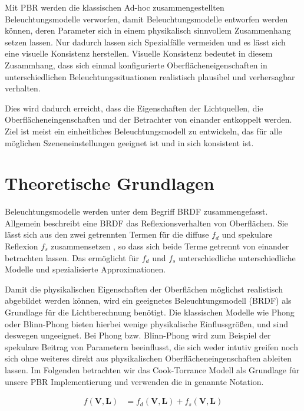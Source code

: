 Mit \ac{PBR} werden die klassischen Ad-hoc zusammengestellten Beleuchtungsmodelle verworfen, damit Beleuchtungsmodelle entworfen werden können, deren Parameter sich in einem physikalisch sinnvollem Zusammenhang setzen lassen. Nur dadurch lassen sich Spezialfälle vermeiden und es lässt sich eine visuelle Konsistenz herstellen. Visuelle Konsistenz bedeutet in diesem Zusammhang, dass sich einmal konfigurierte Oberflächeneigenschaften in unterschiedlichen Beleuchtungssituationen realistisch plausibel und verhersagbar verhalten. 

Dies wird dadurch erreicht, dass die Eigenschaften der Lichtquellen, die Oberflächeneingenschaften und der Betrachter von einander entkoppelt werden. Ziel ist meist ein einheitliches Beleuchtungsmodell zu entwickeln, das für alle möglichen Szeneneinstellungen geeignet ist und in sich konsistent ist.

\section{Theoretische Grundlagen}
\label{sec:pbr-grundlagen}

Beleuchtungsmodelle werden unter dem Begriff \acf{BRDF} zusammengefasst. Allgemein beschreibt eine \ac{BRDF} das Reflexionsverhalten von Oberflächen. Sie lässt sich aus den zwei getrennten Termen für die diffuse $f_d$ und spekulare Reflexion $f_s$ zusammensetzen \parencite[Kapitel 3.1.2, Seite 7]{Rousiers2014}, so dass sich beide Terme getrennt von einander betrachten lassen. Das ermöglicht für $f_d$ und $f_s$ unterschiedliche unterschiedliche Modelle und spezialisierte Approximationen.

Damit die physikalischen Eigenschaften der Oberflächen möglichst realistisch abgebildet werden können, wird ein geeignetes Beleuchtungsmodell (\acf{BRDF}) als Grundlage für die Lichtberechnung benötigt. Die klassischen Modelle wie Phong oder Blinn-Phong bieten hierbei wenige physikalische Einflussgrößen, und sind deswegen ungeeignet. Bei Phong bzw. Blinn-Phong wird zum Beispiel der spekulare Beitrag von Parametern beeinflusst, die sich weder intutiv greifen noch sich ohne weiteres direkt aus physikalischen Oberflächeneingenschaften ableiten lassen. Im Folgenden betrachten wir das Cook-Torrance Modell als Grundlage für unsere \ac{PBR} Implementierung und verwenden die in  genannte Notation.

\begin{align}
	\label{eq:brdf-dekonstruiert}
	f(\mathbf V,\mathbf L) &= f_d(\mathbf V,\mathbf L) + f_s(\mathbf V,\mathbf L)
\end{align}

